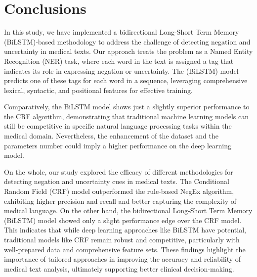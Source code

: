 \documentclass{article}
\begin{document}
\section*{Conclusions}
In this study, we have implemented a bidirectional Long-Short Term Memory (BiLSTM)-based methodology to address the challenge
of detecting negation and uncertainty in medical texts. Our approach treats the problem as a Named Entity Recognition (NER)
task, where each word in the text is assigned a tag that indicates its role in expressing negation or uncertainty. The (BiLSTM)
model predicts one of these tags for each word in a sequence, leveraging comprehensive lexical, syntactic, and positional
features for effective training.

Comparatively, the BiLSTM model shows just a slightly superior performance to the CRF algorithm, demonstrating that
traditional machine learning models can still be competitive in specific natural language processing tasks within the
medical domain. Nevertheless, the enhancement of the dataset and the parameters number could imply a higher performance
on the deep learning model. 

On the whole, our study explored the efficacy of different methodologies for detecting negation and uncertainty cues in
medical texts. The Conditional Random Field (CRF) model outperformed the rule-based NegEx algorithm, exhibiting higher
precision and recall and better capturing the complexity of medical language. On the other hand, the bidirectional Long-Short
Term Memory (BiLSTM) model showed only a slight performance edge over the CRF model. This indicates that while deep learning
approaches like BiLSTM have potential, traditional models like CRF remain robust and competitive, particularly with
well-prepared data and comprehensive feature sets. These findings highlight the importance of tailored approaches in
improving the accuracy and reliability of medical text analysis, ultimately supporting better clinical decision-making.


\printbibliography
\end{document}
